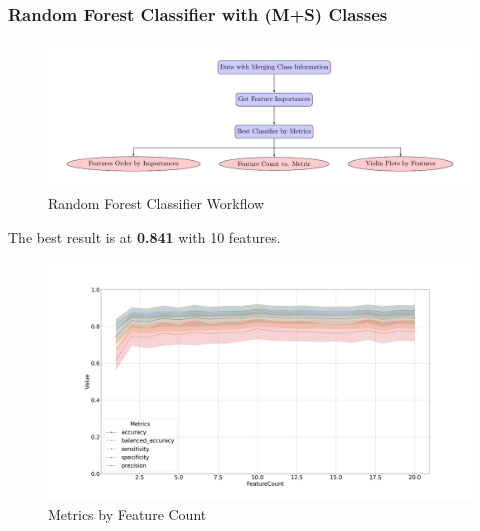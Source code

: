 \documentclass{beamer}
\begin{document}
    \begin{frame}[allowframebreaks]
        \frametitle{Random Forest Classifier with (M+S) Classes}

        \begin{figure}
            \includegraphics[width=0.8 \linewidth]{figures/RandomForest/merge.pdf}
            \caption{Random Forest Classifier Workflow}
        \end{figure}

        The best result is at \textbf{0.841} with 10 features.

        \begin{figure}
            \includegraphics[width=0.8 \linewidth]{figures/RandomForest/two.DADA2.homd/metrics.png}
            \caption{Metrics by Feature Count}
        \end{figure}


\end{frame}
\end{document}
